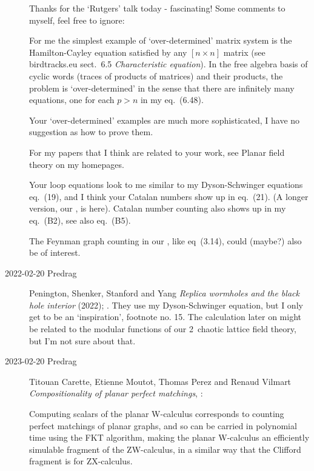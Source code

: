 \begin{description}
Thanks for the `Rutgers' talk today - fascinating!
Some comments to myself, feel free to ignore:

For me the simplest example of `over-determined' matrix system is the
Hamilton-Cayley equation satisfied by any $[n\times{n}]$ matrix (see
birdtracks.eu
{sect.~6.5 {\em Characteristic equation}}). In the free algebra basis of
cyclic words (traces of products of matrices) and their products, the problem
is `over-determined' in the sense that there are infinitely many equations,
one for each $p>n$ in my eq.~(6.48).

Your `over-determined' examples are much more sophisticated, I have no
suggestion as how to prove them.

For my papers that I think are related to your work, see
{Planar field theory} on my homepages.

Your loop equations look to me similar to my 
Dyson-Schwinger equations
 {eq.~(19)},
and I think your Catalan numbers show up in eq.~(21).
(A longer version, our , is
 {here}).
Catalan number counting also shows up in my 
 {eq.~(B2)},
see also eq.~(B5).

The Feynman graph counting in our , like
 {eq~(3.14)},
could (maybe?) also be of interest.

   \item[2022-02-20 Predrag]
Penington, Shenker, Stanford and Yang
{\em Replica wormholes and the black hole interior} (2022);
.
They use my Dyson-Schwinger equation, but I only
get to be an `inspiration', footnote no. 15.
The calculation later on might be related to the modular functions of  our
2\dmn\ chaotic lattice field theory, but I'm not sure about that.

   \item[2023-02-20 Predrag]
Titouan Carette, Etienne Moutot, Thomas Perez and Renaud Vilmart
{\em Compositionality of planar perfect matchings},
:

Computing scalars of the planar W-calculus corresponds to counting perfect
matchings of planar graphs, and so can be carried in polynomial time using
the FKT algorithm, making the planar W-calculus an efficiently simulable
fragment of the ZW-calculus, in a similar way that the Clifford fragment is
for ZX-calculus.


\end{description}
